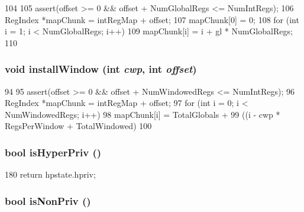 \begin{DoxyCode}
104 {
105     assert(offset >= 0 && offset + NumGlobalRegs <= NumIntRegs);
106     RegIndex *mapChunk = intRegMap + offset;
107     mapChunk[0] = 0;
108     for (int i = 1; i < NumGlobalRegs; i++)
109         mapChunk[i] = i + gl * NumGlobalRegs;
110 }
\end{DoxyCode}
\hypertarget{classSparcISA_1_1ISA_ad1a90ae0758b89c2260267de79805f93}{
\subsubsection[{installWindow}]{\setlength{\rightskip}{0pt plus 5cm}void installWindow (int {\em cwp}, \/  int {\em offset})}}
\label{classSparcISA_1_1ISA_ad1a90ae0758b89c2260267de79805f93}



\begin{DoxyCode}
94 {
95     assert(offset >= 0 && offset + NumWindowedRegs <= NumIntRegs);
96     RegIndex *mapChunk = intRegMap + offset;
97     for (int i = 0; i < NumWindowedRegs; i++)
98         mapChunk[i] = TotalGlobals +
99             ((i - cwp * RegsPerWindow + TotalWindowed) %
100 }
\end{DoxyCode}
\hypertarget{classSparcISA_1_1ISA_a842f98879c435ed5980772bd9a48ec85}{
\subsubsection[{isHyperPriv}]{\setlength{\rightskip}{0pt plus 5cm}bool isHyperPriv ()}}
\label{classSparcISA_1_1ISA_a842f98879c435ed5980772bd9a48ec85}



\begin{DoxyCode}
180 { return hpstate.hpriv; }
\end{DoxyCode}
\hypertarget{classSparcISA_1_1ISA_a3e258d603a97a9f1693046a8f2b227b3}{
\subsubsection[{isNonPriv}]{\setlength{\rightskip}{0pt plus 5cm}bool isNonPriv ()}}
\label{classSparcISA_1_1ISA_a3e258d603a97a9f1693046a8f2b227b3}



